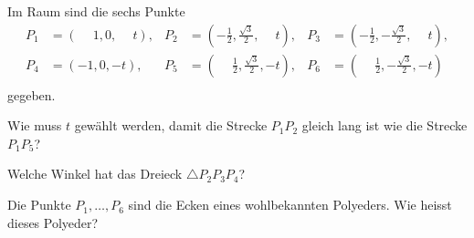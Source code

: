Im Raum sind die sechs Punkte
\begin{align*}
P_1&=(\phantom{-}1,0,\phantom{-}t),&
	P_2&=(\textstyle-\frac12,\textstyle\frac{\sqrt{3}}2,\phantom{-}t),&
		P_3&=(\textstyle-\frac12,-\textstyle\frac{\sqrt{3}}2, \phantom{-}t),\\
P_4&=(-1,0,-t),&
	P_5&=(\textstyle\phantom{-}\frac12,\textstyle\frac{\sqrt{3}}2,-t),&
		P_6&=(\textstyle\phantom{-}\frac12,\textstyle-\frac{\sqrt{3}}2,-t)\\
\end{align*}
gegeben.
\begin{teilaufgaben}
\item
Wie muss $t$ gewählt werden, damit die Strecke $P_1P_2$ gleich lang ist
wie die Strecke $P_1P_5$?
\item
Welche Winkel hat das Dreieck $\triangle P_2P_3P_4$?
\item
Die Punkte $P_1,\dots,P_6$ sind die Ecken eines wohlbekannten Polyeders.
Wie heisst dieses Polyeder?
\end{teilaufgaben}


